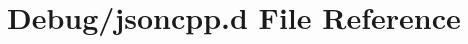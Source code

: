 \hypertarget{Debug_2jsoncpp_8d}{}\section{Debug/jsoncpp.d File Reference}
\label{Debug_2jsoncpp_8d}
